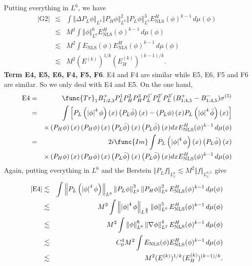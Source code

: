\documentclass[12pt,letterpaper,leqno]{amsart}
\theoremstyle{plain}
\numberwithin{equation}{section}
\numberwithin{theorem}{section}
\numberwithin{proposition}{section}
\numberwithin{lemma}{section}
\numberwithin{corollary}{section}
\begin{document}
Putting everything in $L^{6}$, we have%
\begin{eqnarray*}
\left\vert \text{G2}\right\vert &\lesssim &\int \left\Vert \Delta P_{L}\phi
\right\Vert _{L^{6}}\left\Vert P_{H}\phi \right\Vert _{L^{6}}^{2}\left\Vert
P_{L}\phi \right\Vert _{L^{6}}^{3}E_{\text{NLS}}^{H}(\phi )^{k-1}\,d\mu
(\phi ) \\
&\lesssim &M^{2}\int \left\Vert \phi \right\Vert _{L^{6}}^{6}E_{\text{NLS}%
}^{H}(\phi )^{k-1}\,d\mu (\phi ) \\
&\lesssim &M^{2}\int E_{\text{NLS}}(\phi )E_{\text{NLS}}^{H}(\phi
)^{k-1}\,d\mu (\phi ) \\
&\lesssim &M^{2}(E^{(k)})^{1/k}(E_{H}^{(k)})^{(k-1)/k}.
\end{eqnarray*}%
\textbf{Term E4, E5, E6, F4, F5, F6}. E4 and F4 are similar while E5, E6, F5
and F6 are similar. So we only deal with E4 and E5. On the one hand,%
\begin{eqnarray*}
\text{E4} &=&\func{Tr}_{1}B_{1;2,3}^{+}P_{L}^{1}P_{H}^{2}P_{H}^{3}P_{L}^{1^{%
\prime }}P_{L}^{2^{\prime }}P_{L}^{3^{\prime
}}(B_{1;4,5}^{+}-B_{1;4,5}^{-})\sigma ^{(5)} \\
&=&\int \left[ P_{L}\left( \left\vert \phi \right\vert ^{4}\phi \right)
(x)\left( P_{L}\bar{\phi}\right) (x)-\left( P_{L}\phi \right) (x)P_{L}\left(
\left\vert \phi \right\vert ^{4}\bar{\phi}\right) (x)\right] \\
&&\times \left( P_{H}\phi \right) (x)\left( P_{H}\phi \right) (x)\left( P_{L}%
\bar{\phi}\right) (x)\left( P_{L}\bar{\phi}\right) (x)dxE_{\text{NLS}%
}^{H}(\phi )^{k-1}\,d\mu (\phi ) \\
&=&2i\func{Im}\int P_{L}\left( \left\vert \phi \right\vert ^{4}\phi \right)
(x)\left( P_{L}\bar{\phi}\right) (x) \\
&&\times \left( P_{H}\phi \right) (x)\left( P_{H}\phi \right) (x)\left( P_{L}%
\bar{\phi}\right) (x)\left( P_{L}\bar{\phi}\right) (x)dxE_{\text{NLS}%
}^{H}(\phi )^{k-1}\,d\mu (\phi )
\end{eqnarray*}%
Again, putting everything in $L^{6}$ and the Berstein $\Vert P_{L}f\Vert
_{L_{x}^{6}}\lesssim M^{2}\Vert f\Vert _{L_{x}^{6/5}}$ give%
\begin{eqnarray*}
\left\vert \text{E4}\right\vert &\lesssim &\int \left\Vert P_{L}\left(
\left\vert \phi \right\vert ^{4}\phi \right) \right\Vert _{L^{6}}\left\Vert
P_{L}\phi \right\Vert _{L^{6}}^{3}\left\Vert P_{H}\phi \right\Vert
_{L^{6}}^{2}E_{\text{NLS}}^{H}(\phi )^{k-1}\,d\mu (\phi ) \\
&\lesssim &M^{2}\int \left\Vert \left\vert \phi \right\vert ^{4}\phi
\right\Vert _{L^{\frac{6}{5}}}\left\Vert \phi \right\Vert _{L^{6}}^{5}E_{%
\text{NLS}}^{H}(\phi )^{k-1}\,d\mu (\phi ) \\
&\lesssim &M^{2}\int \left\Vert \phi \right\Vert _{L^{6}}^{6}\left\Vert
\nabla \phi \right\Vert _{L^{2}}^{4}E_{\text{NLS}}^{H}(\phi )^{k-1}\,d\mu
(\phi ) \\
&\lesssim &C_{0}^{4}M^{2}\int E_{\text{NLS}}(\phi )E_{\text{NLS}}^{H}(\phi
)^{k-1}\,d\mu (\phi ) \\
&\lesssim &M^{2}(E^{(k)})^{1/k}(E_{H}^{(k)})^{(k-1)/k}.
\end{eqnarray*}%
\end{document}
